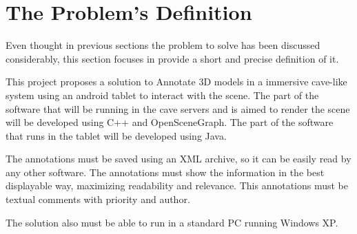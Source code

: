 \section{The Problem's Definition}

Even thought in previous sections the problem to solve has been discussed considerably, this section focuses in provide a short and precise definition of it.

This project proposes a solution to Annotate 3D models in a immersive cave-like system using an android tablet to interact with the scene. The part of the software that will be running in the cave servers and is aimed to render the scene will be developed using C++ and OpenSceneGraph. The part of the software that runs in the tablet will be developed using Java.

The annotations must be saved using an XML archive, so it can be easily read by any other software. The annotations must show the information in the best displayable way, maximizing readability and relevance. This annotations must be textual comments with priority and author.

The solution also must be able to run in a standard PC running Windows XP. 
